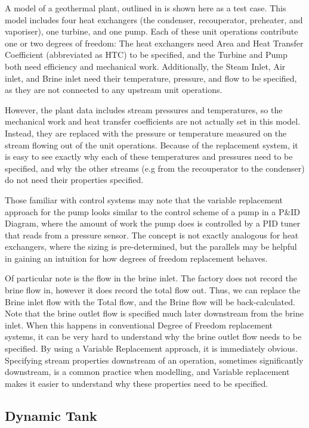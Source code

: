 A model of a geothermal plant, outlined in \citep{severinsen2024digital}
is shown here as a test case. This model includes four heat exchangers
(the condenser, recouperator, preheater, and vaporiser), one turbine,
and one pump. Each of these unit operations contribute one or two
degrees of freedom: The heat exchangers need Area and Heat Transfer
Coefficient (abbreviated as HTC) to be specified, and the Turbine and
Pump both need efficiency and mechanical work. Additionally, the Steam
Inlet, Air inlet, and Brine inlet need their temperature, pressure, and
flow to be specified, as they are not connected to any upstream unit
operations.

However, the plant data includes stream pressures and temperatures, so
the mechanical work and heat transfer coefficients are not actually set
in this model. Instead, they are replaced with the pressure or
temperature measured on the stream flowing out of the unit operations.
Because of the replacement system, it is easy to see exactly why each of
these temperatures and pressures need to be specified, and why the other
streams (e.g from the recouperator to the condenser) do not need their
properties specified.

Those familiar with control systems may note that the variable
replacement approach for the pump looks similar to the control scheme of
a pump in a P\&ID Diagram, where the amount of work the pump does is
controlled by a PID tuner that reads from a pressure sensor. The concept
is not exactly analogous for heat exchangers, where the sizing is
pre-determined, but the parallels may be helpful in gaining an intuition
for how degrees of freedom replacement behaves.

Of particular note is the flow in the brine inlet. The factory does not
record the brine flow in, however it does record the total flow out.
Thus, we can replace the Brine inlet flow with the Total flow, and the
Brine flow will be back-calculated. Note that the brine outlet flow is
specified much later downstream from the brine inlet. When this happens
in conventional Degree of Freedom replacement systems, it can be very
hard to understand why the brine outlet flow needs to be specified. By
using a Variable Replacement approach, it is immediately obvious.
Specifying stream properties downstream of an operation, sometimes
significantly downstream, is a common practice when modelling, and
Variable replacement makes it easier to understand why these properties
need to be specified.

\hypertarget{dynamic-tank}{%
\subsection{Dynamic Tank}\label{dynamic-tank}}

